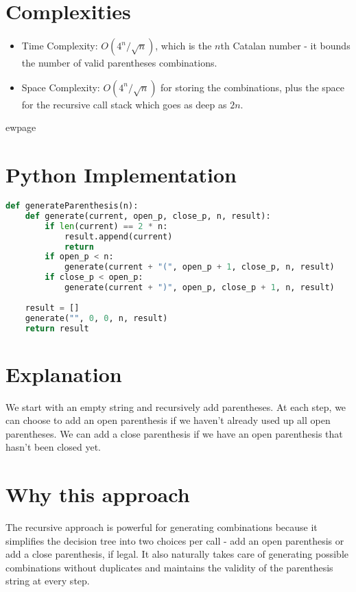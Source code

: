 \section*{Complexities}

\begin{itemize}
    \item Time Complexity: $O(4^n / \sqrt{n})$, which is the $n$th Catalan number - it bounds the number of valid parentheses combinations.
    \item Space Complexity: $O(4^n / \sqrt{n})$ for storing the combinations, plus the space for the recursive call stack which goes as deep as $2n$.
\end{itemize}


ewpage
\section*{Python Implementation}

\begin{fullwidth}
\begin{lstlisting}[language=Python]
def generateParenthesis(n):
    def generate(current, open_p, close_p, n, result):
        if len(current) == 2 * n:
            result.append(current)
            return
        if open_p < n:
            generate(current + "(", open_p + 1, close_p, n, result)
        if close_p < open_p:
            generate(current + ")", open_p, close_p + 1, n, result)
    
    result = []
    generate("", 0, 0, n, result)
    return result
\end{lstlisting}

\end{fullwidth}

\section*{Explanation}

We start with an empty string and recursively add parentheses. At each step, we can choose to add an open parenthesis if we haven't already used up all open parentheses. We can add a close parenthesis if we have an open parenthesis that hasn't been closed yet.

\section*{Why this approach}

The recursive approach is powerful for generating combinations because it simplifies the decision tree into two choices per call - add an open parenthesis or add a close parenthesis, if legal. It also naturally takes care of generating possible combinations without duplicates and maintains the validity of the parenthesis string at every step.

